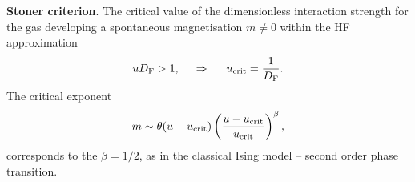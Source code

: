 \textbf{Stoner criterion}.  The critical value of the dimensionless interaction strength for the gas developing a spontaneous magnetisation $m \neq 0$ within the HF approximation
\begin{equation*}
	u D_{\textnormal{F}} > 1,
	\hspace{0.5cm} \Rightarrow \hspace{0.5cm}
	u_{\textnormal{crit}} = \frac{1}{D_{\textnormal{F}}}.
\end{equation*}
The critical exponent 
\begin{equation*}
	m \sim \theta(u - u_{\textnormal{crit}})  \left(\frac{u  - u_{\textnormal{crit}}}{u_{\textnormal{crit}}}\right)^\beta,
\end{equation*}
corresponds to the $\beta = 1/2$, as  in the classical Ising model -- second order phase transition.